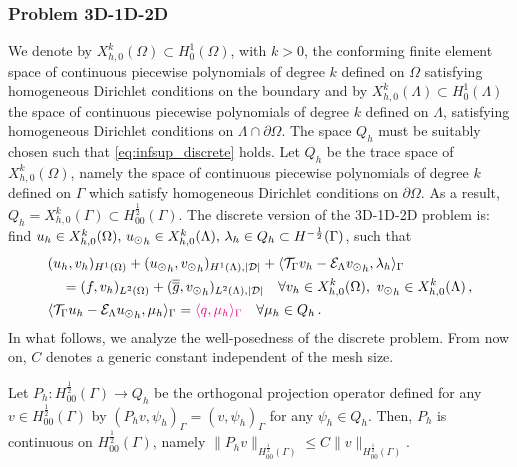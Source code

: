 \documentclass[r]{siamart171218}
\newcommand{\paolo}[1]{{\color{magenta}#1}}
\begin{document}
\subsubsection{Problem 3D-1D-2D}
We denote by $X_{h,0}^k(\Omega)\subset H^1_0(\Omega)$, with $k>0$, the conforming finite element space of continuous piecewise polynomials of degree $k$ defined on $\Omega$ satisfying homogeneous Dirichlet conditions on the boundary and by $X_{h,0}^k(\Lambda)\subset H^1_0(\Lambda)$ the space of continuous piecewise polynomials of degree $k$ defined on $\Lambda$, satisfying homogeneous Dirichlet conditions on $\Lambda \cap \partial \Omega$. The space $Q_h$ must be suitably chosen such that \eqref{eq:infsup_discrete} holds. Let $Q_h$ be the trace space of $X_{h,0}^k(\Omega)$, namely the space of continuous piecewise polynomials of degree $k$ defined on $\Gamma$ which satisfy homogeneous Dirichlet conditions on $\partial \Omega$. As a result, $Q_h=X_{h,0}^k(\Gamma) \subset H^\frac12_{00}(\Gamma)$. The discrete version of the 3D-1D-2D problem is:
find $u_h \in X_{h,0}^k (\Omega) ,\, {u_{\odot}}_h \in X_{h,0}^k(\Lambda) ,\, \lambda_h \in Q_h \subset H^{-\frac12}(\Gamma )$, such that
\begin{subequations}
\begin{align}
&(u_h,v_h)_{H^1(\Omega)} + ({\ud}_h,{\vd}_h)_{H^1(\Lambda),|\D|}
+ \langle \trace v_h  - \mathcal{E}_{\Lambda} {\vd}_h, \lambda_h \rangle_\Gamma
\\
\nonumber
&\quad = (f,v_h)_{L^2(\Omega)} + (\avrd{g},{\vd}_h)_{L^2(\Lambda),|\D|} 
\quad \forall v_h \in X_{h,0}^k(\Omega), \ {\vd}_h \in X_{h,0}^k(\Lambda)\,,
\\
&\langle \trace u_h - \mathcal{E}_{\Lambda} {\ud}_h , \mu_h \rangle_\Gamma 
= \paolo{\langle q,\mu_h \rangle_\Gamma}
\quad \forall \mu_h \in Q_h\,.
\end{align}
\end{subequations}
In what follows, we analyze the well-posedness of the discrete problem. 
From now on, $C$ denotes a generic constant independent of the mesh size.

\begin{lemma}\label{lemma:prob1_orthproj}
Let $P_h: H^{\frac 12}_{00}(\Gamma) \rightarrow Q_h$ be the orthogonal projection operator defined  for any $v \in H^{\frac 12}_{00}(\Gamma)$ by
$(P_h v , \psi_h)_\Gamma= (v, \psi_h)_\Gamma$ for any $\psi_h \in Q_h$.
Then, $P_h$ is continuous on $H^{\frac 12}_{00}(\Gamma)$, namely
$\|P_h v\|_{H^{\frac 12}_{00}(\Gamma)} \leq C \|v\|_{H^{\frac 12}_{00}(\Gamma)}$.
\end{lemma}
\end{document}
